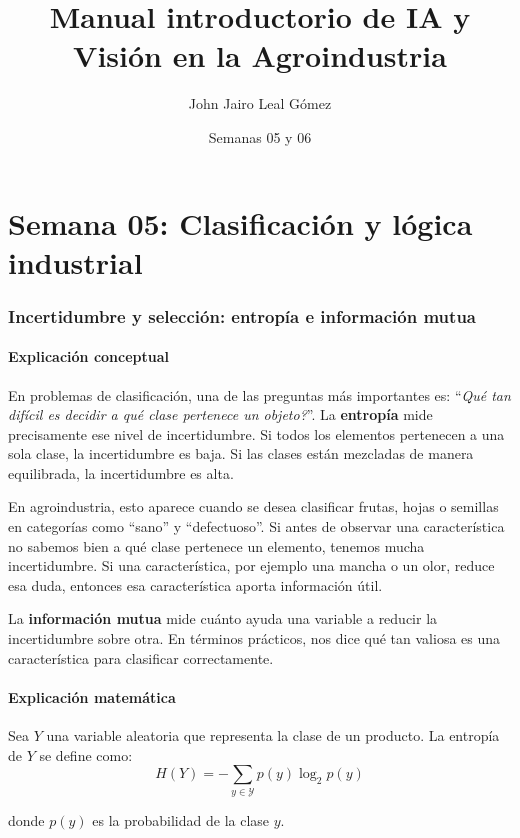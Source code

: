\documentclass[12pt]{article}
\title{Manual introductorio de IA y Visión en la Agroindustria}
\author{John Jairo Leal Gómez}
\date{Semanas 05 y 06}
\begin{document}
\maketitle
\tableofcontents
\newpage

\part{Semana 05: Clasificación y lógica industrial}

\section{Incertidumbre y selección: entropía e información mutua}

\subsection{Explicación conceptual}
En problemas de clasificación, una de las preguntas más importantes es: ``\textit{Qué tan difícil es decidir a qué clase pertenece un objeto?}''.
La \textbf{entropía} mide precisamente ese nivel de incertidumbre.
Si todos los elementos pertenecen a una sola clase, la incertidumbre es baja.
Si las clases están mezcladas de manera equilibrada, la incertidumbre es alta.

En agroindustria, esto aparece cuando se desea clasificar frutas, hojas o semillas en categorías como ``sano'' y ``defectuoso''.
Si antes de observar una característica no sabemos bien a qué clase pertenece un elemento, tenemos mucha incertidumbre.
Si una característica, por ejemplo una mancha o un olor, reduce esa duda, entonces esa característica aporta información útil.

La \textbf{información mutua} mide cuánto ayuda una variable a reducir la incertidumbre sobre otra.
En términos prácticos, nos dice qué tan valiosa es una característica para clasificar correctamente.

\subsection{Explicación matemática}
Sea \(Y\) una variable aleatoria que representa la clase de un producto.
La entropía de \(Y\) se define como:
\[
H(Y) = - \sum_{y \in \mathcal{Y}} p(y)\log_2 p(y)
\]

donde \(p(y)\) es la probabilidad de la clase \(y\).
\end{document}
